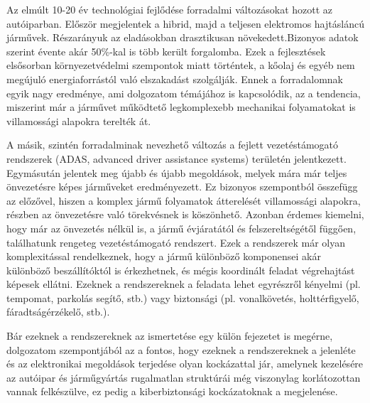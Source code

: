 Az elmúlt 10-20 év technológiai fejlődése forradalmi változásokat hozott az autóiparban. Először megjelentek a hibrid, majd a teljesen elektromos hajtásláncú járművek. Részarányuk az eladásokban drasztikusan növekedett.Bizonyos adatok szerint évente akár 50\%-kal is több került forgalomba. Ezek a fejlesztések elsősorban környezetvédelmi szempontok miatt történtek, a kőolaj és egyéb nem megújuló energiaforrástól való elszakadást szolgálják. Ennek a forradalomnak egyik nagy eredménye, ami dolgozatom témájához is kapcsolódik, az a tendencia, miszerint már a járművet működtető legkomplexebb mechanikai folyamatokat  is villamossági alapokra terelték át.



A másik, szintén forradalminak nevezhető változás a fejlett vezetéstámogató rendszerek (ADAS, advanced driver assistance systems) területén jelentkezett. Egymásután jelentek meg újabb és újabb megoldások, melyek mára már teljes önvezetésre képes járműveket eredményezett. Ez bizonyos szempontból összefügg az előzővel, hiszen a komplex jármű folyamatok átterelését villamossági alapokra, részben az önvezetésre való törekvésnek is köszönhető. Azonban érdemes kiemelni, hogy már az önvezetés nélkül is, a jármű évjáratától és felszereltségétől függően, találhatunk rengeteg vezetéstámogató rendszert. Ezek a rendszerek már olyan komplexitással rendelkeznek, hogy a jármű különböző komponensei akár különböző beszállítóktól is érkezhetnek, és mégis koordinált feladat végrehajtást  képesek ellátni. Ezeknek a rendszereknek a feladata lehet egyrészről kényelmi (pl. tempomat, parkolás segítő, stb.) vagy biztonsági (pl. vonalkövetés, holttérfigyelő, fáradtságérzékelő, stb.).


Bár ezeknek a rendszereknek az ismertetése egy külön fejezetet is megérne, dolgozatom szempontjából az a fontos, hogy ezeknek a rendszereknek a jelenléte és az elektronikai megoldások terjedése olyan kockázattal jár, amelynek kezelésére az autóipar és járműgyártás rugalmatlan struktúrái még viszonylag korlátozottan vannak felkészülve, ez pedig a kiberbiztonsági kockázatoknak a megjelenése. \\


